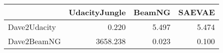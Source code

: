 \begin{tabular}{lrrr}
\toprule
{} &  UdacityJungle &  BeamNG &  SAEVAE \\
\midrule
Dave2Udacity &          0.220 &   5.497 &   5.474 \\
Dave2BeamNG  &       3658.238 &   0.023 &   0.100 \\
\bottomrule
\end{tabular}
